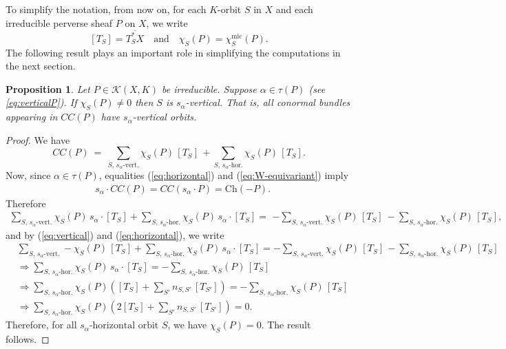 \documentclass[a4paper, 11pt]{article}
\newtheorem{prop}[theo]{Proposition}
\begin{document}
To simplify the notation, from now on, for each $K$-orbit $S$ in $X$
and each irreducible perverse sheaf $P$ on $X$, we write 
$$
[T_S]=\overline{T_S^\ast X}\quad\text{and}\quad \chi_{S}^{}(P) =
\chi_{S}^{\mathrm{mic}}(P).
$$
The following result  plays an important role in 
simplifying the computations in the next section.
\begin{prop}\label{prop:CC2}
Let $P \in \mathscr{K}(X,K)$ be irreducible.
Suppose $\alpha \in \tau (P)$ (see \eqref{eq:verticalP}). If 
$\chi_{S} (P) \neq 0$ then $S$ is $s_\alpha$-vertical. 
That is, all conormal bundles appearing in ${CC}(P)$ have
$s_\alpha$-vertical orbits. 
\end{prop}
\begin{proof} 
We have
$$
CC(P)\ =\ \sum_{S,\, s_\alpha\mbox{-vert.}} \chi_{S}^{}(P)
  \, [T_{S}]\, +  \sum_{S,\, s_\alpha\mbox{-hor.}}
  \chi_{S}^{}(P)   \,   [T_{S}].
$$
Now, since $\alpha \in \tau (P)$, equalities (\ref{eq:horizontal}) and
(\ref{eq:W-equivariant}) imply   
  \begin{align*}
  &s_{\alpha}\cdot {CC}(P) = 
{CC}(s_\alpha\cdot P)  
  =\mathrm{Ch}(-P).
\end{align*}
Therefore
\begin{align*}
  \sum_{S,\, s_\alpha\mbox{-vert.}} \chi_{S}^{}(P)
  \,s_{\alpha} \cdot [T_{S}] +  \sum_{S,\, s_\alpha\mbox{-hor.}}
  \chi_{S}^{}(P)   \,s_{\alpha} \cdot   [T_{S}] =&
   -\sum_{S,\, s_\alpha\mbox{-vert.}} \chi_{S}^{}(P)
  \, [T_{S}]\ -\sum_{S,\, s_\alpha\mbox{-hor.}}
  \chi_{S}^{}(P)   \,   [T_{S}],
\end{align*}
and by (\ref{eq:vertical}) and (\ref{eq:horizontal}), we  write
\begin{align*}  
  &\sum_{S,\, s_\alpha\mbox{-vert.}} -\chi_{S}^{}(P)
  \,[T_{S}] +  \sum_{S,\, s_\alpha\mbox{-hor.}}
  \chi_{S}(P)   \,s_{\alpha} \cdot   [T_{S}] =
   -\sum_{S,\, s_\alpha\mbox{-vert.}} \chi_{S}^{}(P)
  \, [T_{S}] \, -
  \sum_{S,\, s_\alpha\mbox{-hor.}}
  \chi_{S}^{}(P)   \,   [T_{S}]\\
  &\Longrightarrow   \sum_{S,\, s_\alpha\mbox{-hor.}}
  \chi_{S}^{}(P)   \,s_{\alpha} \cdot   [T_{S}] =
   -  \sum_{S,\, s_\alpha\mbox{-hor.}}
   \chi_{S}^{}(P)   \,   [T_{S}]\\
   &\Longrightarrow  \sum_{S,\, s_\alpha\mbox{-hor.}}
  \chi_{S}^{}(P)   \left([T_{S}] + \sum_{S'}
  n_{S,S'} \,  [T_{S'}]\right)=
   -  \sum_{S,\, s_\alpha\mbox{-hor.}}
   \chi_{S}^{}(P)   \,   [T_{S}]\\
   &\Longrightarrow  \sum_{S,\, s_\alpha\mbox{-hor.}}
  \chi_{S}^{}(P)   \left(2[T_{S}] + \sum_{S'}
  n_{S,S'} \,  [T_{S'}]\right) = 0.
\end{align*}  
Therefore, for all $s_\alpha\mbox{-horizontal orbit }S$, we have
$\chi_{S}^{}(P)=0.$ 
The result follows.  
\end{proof}
\end{document}
